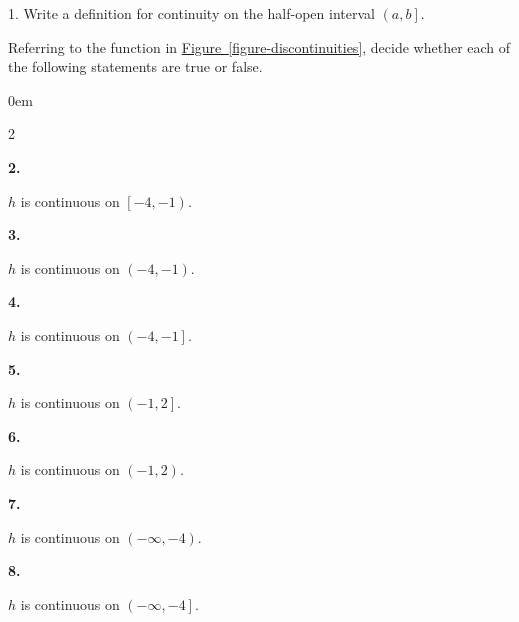 \documentclass[12pt,]{book}
\theoremstyle{plain}
\theoremstyle{definition}
\numberwithin{equation}{section}
\newenvironment{exercisegroup}%
{\medskip\noindent}%
{\par\bigskip}%
\newlength{\exercisegroupindent}%
\newlength{\exercisegroupitemwidth}%
\newenvironment{exercisegrouplist}%
{\vspace{-\partopsep}%
\begin{adjustwidth}{\exercisegroupindent}{0em}}%
{\end{adjustwidth}%
\vspace{-\partopsep}%
\vspace{\baselineskip}}%
\newenvironment{exercisegroupbycol}[1]%
{\begin{exercisegrouplist}%
\vspace{-\multicolsep}%
\begin{multicols}{#1}%
\setlength{\parindent}{0em}%
\setlength{\exercisegroupitemwidth}{\linewidth}}%
{\end{multicols}%
\vspace{-\multicolsep}%
\end{exercisegrouplist}}%
\newenvironment{exercisegroupitem}[1]%
{\begin{minipage}[t]{\exercisegroupitemwidth}
\vspace{0pt}%
{\bfseries#1}%
\rule{0pt}{\baselineskip}}{\strut%
\end{minipage}%
\hspace{\columnsep}}%
\providecommand\phantomsection{}
\newcommand{\ointerval}[2]{\left(#1,#2\right)}
\newcommand{\cointerval}[2]{\left[\left.#1,#2\right)\right.}
\newcommand{\ocinterval}[2]{\left(\left.#1,#2\right]\right.}
\begin{document}
\begin{exerciselist}
\item[1.]\phantomsection\hypertarget{exercise-112}{\null}Write a definition for continuity on the half-open interval \(\ocinterval{a}{b}\).%
\par\smallskip
\end{exerciselist}
\begin{exercisegroup}%
Referring to the function in \hyperref[figure-discontinuities]{Figure~\ref*{figure-discontinuities}}, decide whether each of the following statements are true or false.%
\par
\begin{exercisegroupbycol}{2}%
\begin{exercisegroupitem}{2. }\phantomsection\hypertarget{exercise-113}{\null}
\(h\) is continuous on \(\cointerval{-4}{-1}\).%
\end{exercisegroupitem}%
\par%
\begin{exercisegroupitem}{3. }\phantomsection\hypertarget{exercise-114}{\null}
\(h\) is continuous on \(\ointerval{-4}{-1}\).%
\end{exercisegroupitem}%
\par%
\begin{exercisegroupitem}{4. }\phantomsection\hypertarget{exercise-115}{\null}
\(h\) is continuous on \(\ocinterval{-4}{-1}\).%
\end{exercisegroupitem}%
\par%
\begin{exercisegroupitem}{5. }\phantomsection\hypertarget{exercise-116}{\null}
\(h\) is continuous on \(\ocinterval{-1}{2}\).%
\end{exercisegroupitem}%
\par%
\begin{exercisegroupitem}{6. }\phantomsection\hypertarget{exercise-117}{\null}
\(h\) is continuous on \(\ointerval{-1}{2}\).%
\end{exercisegroupitem}%
\par%
\begin{exercisegroupitem}{7. }\phantomsection\hypertarget{exercise-118}{\null}
\(h\) is continuous on \(\ointerval{-\infty}{-4}\).%
\end{exercisegroupitem}%
\par%
\begin{exercisegroupitem}{8. }\phantomsection\hypertarget{exercise-119}{\null}
\(h\) is continuous on \(\ocinterval{-\infty}{-4}\).%
\end{exercisegroupitem}%
\par%
\end{exercisegroupbycol}%
\end{exercisegroup}%
\end{document}
